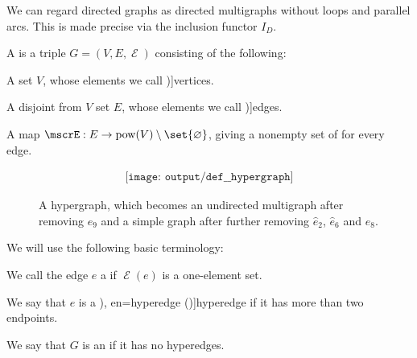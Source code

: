 \begin{comments}
  \item We can regard directed graphs as directed multigraphs without loops and parallel arcs. This is made precise via the inclusion functor \hyperref[def:graph_functors/directed_inclusion]{\( I_D \)}.
\end{comments}

\begin{definition}\label{def:hypergraph}
  A  is a triple \( G = (V, E, \mscrE) \) consisting of the following:
  \begin{thmenum}[series=def:hypergraph]
     A set \( V \), whose elements we call \term[ru=вершины (\cite[298]{ЕмеличевИПр1990Графы})]{vertices}.

     A disjoint from \( V \) set \( E \), whose elements we call \term[ru=рёбра (\cite[298]{ЕмеличевИПр1990Графы})]{edges}.

     A map \( \mscrE: E \to \pow(V) \setminus \set{ \varnothing } \), giving a nonempty set of  for every edge.
  \end{thmenum}

  \begin{figure}[!ht]
    \begin{equation}\label{eq:fig:def:hypergraph}
      \begin{aligned}
        \texttt{[image: output/def\_\_hypergraph]}
      \end{aligned}
    \end{equation}
    \caption{A hypergraph, which becomes an undirected multigraph after removing \( e_9 \) and a simple graph after further removing \( \widehat{e}_2 \), \( \widehat{e}_6 \) and \( e_8 \).}\label{fig:def:hypergraph}
  \end{figure}

  We will use the following basic terminology:
  \begin{thmenum}[resume=def:hypergraph]
     We call the edge \( e \) a  if \( \mscrE(e) \) is a one-element set.

     We say that \( e \) is a \term[ru=гипердуги (\cite[\S 7.1.5]{Новиков2013ДискретнаяМатематика}), en=hyperedge (\cite[684]{Rosen2018DiscreteHandbook})]{hyperedge} if it has more than two endpoints.

     We say that \( G \) is an  if it has no hyperedges.


\end{thmenum}
\end{definition}
